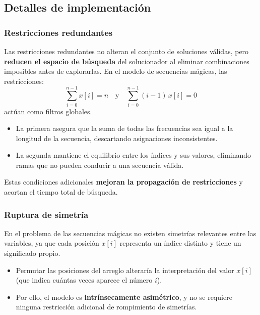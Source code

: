 
\subsection{Detalles de implementación}\label{sec:03-secuencia-magica-impl}

\subsubsection*{Restricciones redundantes}
  Las restricciones redundantes no alteran el conjunto de soluciones válidas, pero \textbf{reducen el espacio de búsqueda} del solucionador al eliminar combinaciones imposibles antes de explorarlas.  
  En el modelo de secuencias mágicas, las restricciones:
  \[
  \sum_{i=0}^{n-1} x[i] = n
  \quad\text{y}\quad
  \sum_{i=0}^{n-1} (i-1)\,x[i] = 0
  \]
  actúan como filtros globales.  
  \begin{itemize}
    \item La primera asegura que la suma de todas las frecuencias sea igual a la longitud de la secuencia, descartando asignaciones inconsistentes.
    \item La segunda mantiene el equilibrio entre los índices y sus valores, eliminando ramas que no pueden conducir a una secuencia válida.
  \end{itemize}
  Estas condiciones adicionales \textbf{mejoran la propagación de restricciones} y acortan el tiempo total de búsqueda.

\subsubsection*{Ruptura de simetría}
  En el problema de las secuencias mágicas no existen simetrías relevantes entre las variables, ya que cada posición \(x[i]\) representa un índice distinto y tiene un significado propio.  
  \begin{itemize}
    \item Permutar las posiciones del arreglo alteraría la interpretación del valor \(x[i]\) (que indica cuántas veces aparece el número \(i\)).
    \item Por ello, el modelo es \textbf{intrínsecamente asimétrico}, y no se requiere ninguna restricción adicional de rompimiento de simetrías.
  \end{itemize}